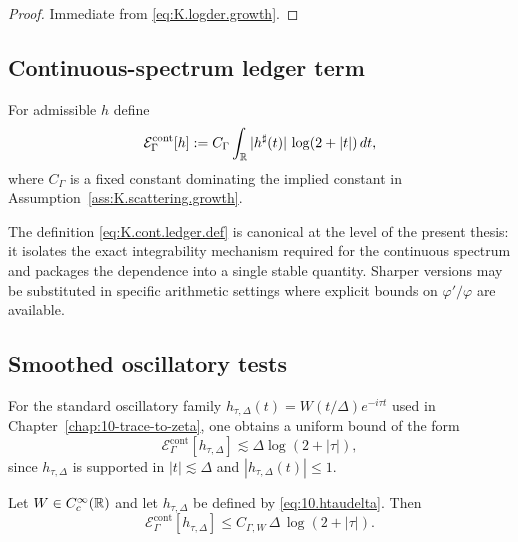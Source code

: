 \begin{proof}
Immediate from \eqref{eq:K.logder.growth}.
\end{proof}

\subsection{Continuous-spectrum ledger term}
\label{subsec:K.cont.ledger}

\begin{definition}
\label{def:K.cont.ledger}
For admissible $h$ define
\begin{equation}\label{eq:K.cont.ledger.def}
\mathcal{E}^{\mathrm{cont}}_\Gamma[h]
:=
C_\Gamma
\int_{\mathbb{R}}
|h^\sharp(t)|\,\log(2+|t|)\,dt,
\end{equation}
where $C_\Gamma$ is a fixed constant dominating the implied constant in
Assumption~\ref{ass:K.scattering.growth}.
\end{definition}

\begin{remark}
\label{rem:K.cont.ledger}
The definition \eqref{eq:K.cont.ledger.def} is canonical at the level of the present thesis:
it isolates the exact integrability mechanism required for the continuous spectrum and packages the dependence into a
single stable quantity.
Sharper versions may be substituted in specific arithmetic settings where explicit bounds on $\varphi'/\varphi$ are
available.
\end{remark}

\subsection{Smoothed oscillatory tests}
\label{subsec:K.smoothed}

For the standard oscillatory family $h_{\tau,\Delta}(t)=W(t/\Delta)e^{-i\tau t}$ used in
Chapter~\ref{chap:10-trace-to-zeta}, one obtains a uniform bound of the form
\[
\mathcal{E}^{\mathrm{cont}}_\Gamma[h_{\tau,\Delta}]
\lesssim
\Delta \log(2+|\tau|),
\]
since $h_{\tau,\Delta}$ is supported in $|t|\lesssim \Delta$ and $|h_{\tau,\Delta}(t)|\le 1$.

\begin{lemma}
\label{lem:K.osc.bound}
Let $W\in C_c^\infty(\mathbb{R})$ and let $h_{\tau,\Delta}$ be defined by \eqref{eq:10.htaudelta}.
Then
\begin{equation}\label{eq:K.osc.bound}
\mathcal{E}^{\mathrm{cont}}_\Gamma[h_{\tau,\Delta}]
\le
C_{\Gamma,W}\,\Delta\,\log(2+|\tau|).
\end{equation}
\end{lemma}


